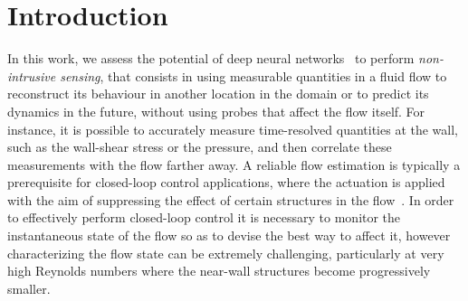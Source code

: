%
%
%
%





%




\section{Introduction}

In this work, we assess the potential of deep neural networks~\cite[DNNs, see][]{lecun2015deep} to perform {\it non-intrusive sensing}, that consists in using measurable quantities in a fluid flow to reconstruct its behaviour in another location in the domain or to predict its dynamics in the future, without using probes that affect the flow itself.
For instance, it is possible to accurately measure time-resolved quantities at the wall, such as the wall-shear stress or the pressure, and then correlate these measurements with the flow farther away.
A reliable flow estimation is typically a prerequisite for closed-loop control applications, where the actuation is applied with the aim of suppressing the effect of certain structures in the flow~\citep{choi1994active}.
In order to effectively perform closed-loop control it is necessary to monitor the instantaneous state of the flow so as to devise the best way to affect it, however characterizing the flow state can be extremely challenging, particularly at very high Reynolds numbers where the near-wall structures become progressively smaller.

